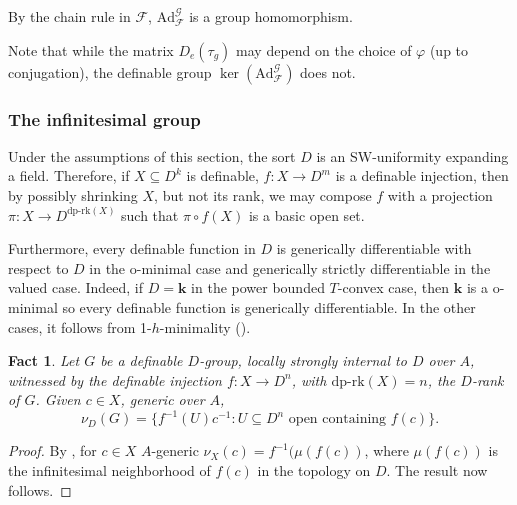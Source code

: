 \documentclass[11pt]{amsart}
\newtheorem{fact}[theorem]{Fact}
\theoremstyle{definition}
\newcommand{\bk}{\textbf{k}}
\newcommand{\CF}{{\mathscr F}}
\newcommand{\CG}{{\mathcal G}}
\newcommand{\0}{\emptyset}
\renewcommand{\phi}{\varphi}
\newcommand{\ad}{\mathrm{Ad}}
\def\dpr{\mathrm{dp\text{-}rk}}
\def\sub{\subseteq}
\begin{document}
By the chain rule in $\CF$, $\ad^\CG_\CF$ is a group homomorphism. 

Note that while the matrix $D_e(\tau_g)$ may depend on the choice of $\phi$ (up to conjugation), the definable group  $\ker(\ad^\CG_\CF)$ does not. 



\subsubsection{The infinitesimal group}
Under the assumptions of this section, the sort $D$ is an SW-uniformity expanding a field. Therefore, if $X\sub D^k$ is definable, $f: X\to D^m$ is a definable injection, then by possibly shrinking $X$, but not its rank, we may compose $f$ with a projection $\pi: X\to D^{\dpr(X)}$ such that $ \pi\circ f (X)$  is a basic open set. 
 
 Furthermore, every definable function in $D$ is generically differentiable with respect to $D$ in the o-minimal case and generically strictly differentiable in the valued case. Indeed, if $D=\bk$ in the power bounded $T$-convex case, then $\bk$ is a o-minimal so every definable function is generically differentiable. In the other cases, it follows from 1-$h$-minimality (\cite[Proposition 3.12]{AcHa}).

\begin{fact}\label{F: nu in K}
Let $G$ be a definable $D$-group, locally strongly internal to $D$ over $A$, witnessed by the definable injection $f:X\to D^n$, with $\dpr(X)=n$, the $D$-rank of $G$. Given $c\in X$, generic over $A$, 
\[\nu_D(G)=\{f^{-1}(U)c^{-1}:U\subseteq D^n \text{ open  containing } f(c)\}.\]
\end{fact}
\begin{proof}
 By \cite[Proposition 5.6]{HaHaPeGps}, for $c\in X$ $A$-generic $\nu_X(c)=f^{-1}(\mu(f(c))$, where $\mu(f(c))$ is the infinitesimal neighborhood of $f(c)$ in the topology on $D$. The result now follows. 
\end{proof}
\end{document}
